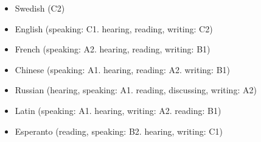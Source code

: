 \documentclass[11pt,a4paper]{article}
\begin{document}
\begin{itemize}
\item Swedish (C2)

\item English (speaking: C1. hearing, reading, writing: C2)

\item French (speaking: A2. hearing, reading, writing: B1)

\item Chinese (speaking: A1. hearing, reading: A2. writing: B1)

\item Russian (hearing, speaking: A1. reading, discussing, writing: A2)

\item Latin (speaking: A1. hearing, writing: A2. reading: B1)

\item Esperanto (reading, speaking: B2. hearing, writing: C1)
\end{itemize}
\end{document}
